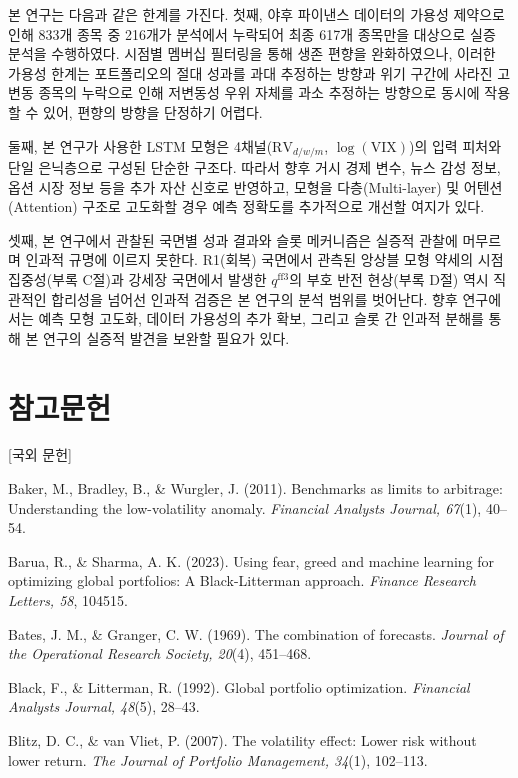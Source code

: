 \documentclass{article}
\begin{document}
본 연구는 다음과 같은 한계를 가진다. 첫째, 야후 파이낸스 데이터의 가용성 제약으로 인해 833개 종목 중 216개가 분석에서 누락되어 최종 617개 종목만을 대상으로 실증 분석을 수행하였다. 시점별 멤버십 필터링을 통해 생존 편향을 완화하였으나, 이러한 가용성 한계는 포트폴리오의 절대 성과를 과대 추정하는 방향과 위기 구간에 사라진 고변동 종목의 누락으로 인해 저변동성 우위 자체를 과소 추정하는 방향으로 동시에 작용할 수 있어, 편향의 방향을 단정하기 어렵다.

둘째, 본 연구가 사용한 LSTM 모형은 4채널($\mathrm{RV}_{d/w/m}$, $\log(\mathrm{VIX})$)의 입력 피처와 단일 은닉층으로 구성된 단순한 구조다. 따라서 향후 거시 경제 변수, 뉴스 감성 정보, 옵션 시장 정보 등을 추가 자산 신호로 반영하고, 모형을 다층(Multi-layer) 및 어텐션(Attention) 구조로 고도화할 경우 예측 정확도를 추가적으로 개선할 여지가 있다.

셋째, 본 연구에서 관찰된 국면별 성과 결과와 슬롯 메커니즘은 실증적 관찰에 머무르며 인과적 규명에 이르지 못한다. R1(회복) 국면에서 관측된 앙상블 모형 약세의 시점 집중성(부록 C절)과 강세장 국면에서 발생한 $q^{\mathrm{ff3}}$의 부호 반전 현상(부록 D절) 역시 직관적인 합리성을 넘어선 인과적 검증은 본 연구의 분석 범위를 벗어난다. 향후 연구에서는 예측 모형 고도화, 데이터 가용성의 추가 확보, 그리고 슬롯 간 인과적 분해를 통해 본 연구의 실증적 발견을 보완할 필요가 있다.










\section*{참고문헌}

[국외 문헌]

Baker, M., Bradley, B., & Wurgler, J. (2011). Benchmarks as limits to arbitrage: Understanding the low-volatility anomaly. \textit{Financial Analysts Journal, 67}(1), 40–54.

Barua, R., & Sharma, A. K. (2023). Using fear, greed and machine learning for optimizing global portfolios: A Black-Litterman approach. \textit{Finance Research Letters, 58}, 104515.

Bates, J. M., & Granger, C. W. (1969). The combination of forecasts. \textit{Journal of the Operational Research Society, 20}(4), 451–468.

Black, F., & Litterman, R. (1992). Global portfolio optimization. \textit{Financial Analysts Journal, 48}(5), 28–43.

Blitz, D. C., & van Vliet, P. (2007). The volatility effect: Lower risk without lower return. \textit{The Journal of Portfolio Management, 34}(1), 102–113.
\end{document}

